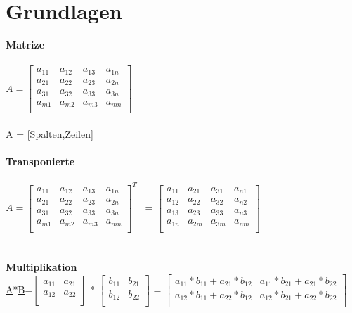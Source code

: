 \section{Grundlagen}
\textbf{Matrize} \\
\\
$A = 
\begin{bmatrix}
a_{11} & a_{12} & a_{13} & a_{1n} \\
a_{21} & a_{22}& a_{23} & a_{2n} \\
a_{31} & a_{32} & a_{33} & a_{3n} \\
a_{m1} & a_{m2} & a_{m3} & a_{mn} \\
\end{bmatrix}
$   
\\
\\
A = [Spalten,Zeilen]
\\
\\
\textbf{Transponierte} \\
\\
$A = 
\begin{bmatrix}
a_{11} & a_{12} & a_{13} & a_{1n} \\
a_{21} & a_{22}& a_{23} & a_{2n} \\
a_{31} & a_{32} & a_{33} & a_{3n} \\
a_{m1} & a_{m2} & a_{m3} & a_{mn} \\
\end{bmatrix}^T
$  
\
=
$\begin{bmatrix}
a_{11} & a_{21} & a_{31} & a_{n1} \\
a_{12} & a_{22} & a_{32} & a_{n2} \\
a_{13} & a_{23} & a_{33} & a_{n3} \\
a_{1n} & a_{2m} & a_{3m} & a_{nm} \\
\end{bmatrix}
$  
\\
\\
\\
\textbf{Multiplikation} \\
\underline{A}*\underline{B}=$\begin{bmatrix}
a_{11} & a_{21}  \\
a_{12} & a_{22}  \\
\end{bmatrix}$
*
$\begin{bmatrix}
b_{11} & b_{21}  \\
b_{12} & b_{22}  \\
\end{bmatrix}$
=
$\begin{bmatrix}
a_{11}*b_{11}+a_{21}*b_{12} & a_{11}*b_{21}+a_{21}*b_{22}  \\
a_{12}*b_{11}+a_{22}*b_{12} & a_{12}*b_{21}+a_{22}*b_{22}  \\
\end{bmatrix}$
